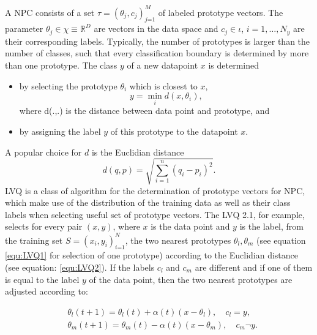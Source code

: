 \documentclass[12pt,oneside,a4paper,parskip]{scrbook}
\newcommand{\R}{\mathbb{R}}
\begin{document}
A NPC consists of a set $\tau = (\theta_j, c_j)^M_\textit{j=1}$ of labeled prototype vectors. The parameter $\theta_j \in \chi \equiv \R^D$
are vectors in the data space and $c_j \in \iota$, $i = 1,\dots,N_y$ are their corresponding labels. Typically, 
the number of prototypes is larger than the number of classes, such that every classification boundary is determined by 
more than one prototype.
The class $y$ of a new datapoint $x$ is determined 

\begin{itemize}
  \item by selecting the prototype $\theta_i$ which is closest to $x$,
  \begin{equation}
    y = \displaystyle\min_{i} d(x,\theta_i),
    \label{equ:LVQ1}
  \end{equation}
  where d(.,.) is the distance between data point and prototype, and
  \item by assigning the label $y$ of this prototype to the datapoint $x$.
\end{itemize}

A popular choice for $d$ is the Euclidian distance 
\begin{equation}
  d(q,p) = \sqrt{\displaystyle\sum^n_\textit{i = 1}(q_i-p_i)^2}.
  \label{equ:LVQ2}
\end{equation}
LVQ is a class of algorithm for the determination of prototype vectors for NPC, which make use of the distribution of the
training data as well as their class labels when selecting useful set of prototype vectors. 
The LVQ 2.1, for example, selects for every pair $(x,y)$, where $x$ is the data point and $y$ is the label, from
the training set $S = (x_i,y_i)^N_\textit{i=1}$, the two nearest prototypes $\theta_l,\theta_m$ (see equation \ref{equ:LVQ1} 
for selection of one prototype) according to the Euclidian distance (see equation: \ref{equ:LVQ2}).
If the labels $c_l$ and $c_m$ are different and if one of them is equal to the label $y$ of the data point, then the two nearest
prototypes are adjusted according to:

\begin{equation}
  \begin{split}
    &\theta_l(t+1) = \theta_l(t) + \alpha(t)(x-\theta_l), \quad c_l = y,\\
    &\theta_m(t+1) = \theta_m(t) - \alpha(t)(x-\theta_m), \quad c_m \neg y.
  \end{split}
  \label{equ:LVQ3}
\end{equation}
\end{document}
